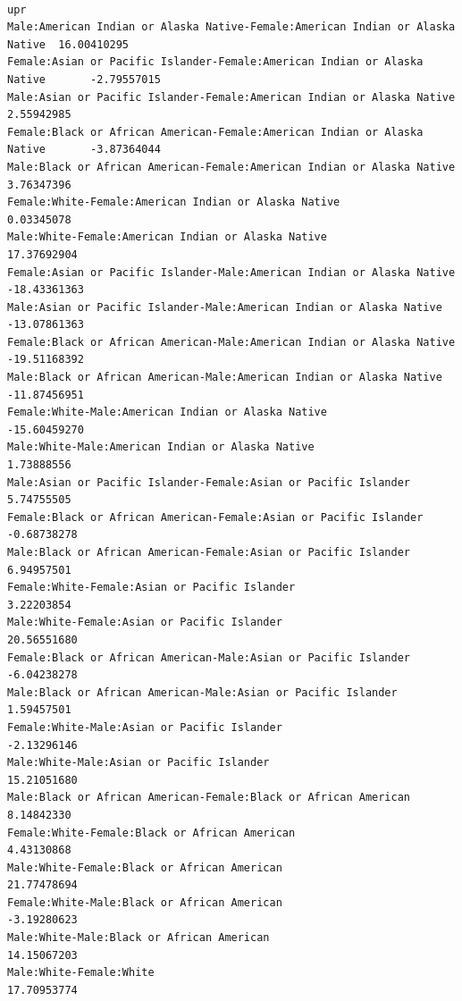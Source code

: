 \documentclass[
  letterpaper,
  DIV=11,
  numbers=noendperiod]{scrartcl}
\begin{document}
\begin{verbatim}
                                                                                       upr
Male:American Indian or Alaska Native-Female:American Indian or Alaska Native  16.00410295
Female:Asian or Pacific Islander-Female:American Indian or Alaska Native       -2.79557015
Male:Asian or Pacific Islander-Female:American Indian or Alaska Native          2.55942985
Female:Black or African American-Female:American Indian or Alaska Native       -3.87364044
Male:Black or African American-Female:American Indian or Alaska Native          3.76347396
Female:White-Female:American Indian or Alaska Native                            0.03345078
Male:White-Female:American Indian or Alaska Native                             17.37692904
Female:Asian or Pacific Islander-Male:American Indian or Alaska Native        -18.43361363
Male:Asian or Pacific Islander-Male:American Indian or Alaska Native          -13.07861363
Female:Black or African American-Male:American Indian or Alaska Native        -19.51168392
Male:Black or African American-Male:American Indian or Alaska Native          -11.87456951
Female:White-Male:American Indian or Alaska Native                            -15.60459270
Male:White-Male:American Indian or Alaska Native                                1.73888556
Male:Asian or Pacific Islander-Female:Asian or Pacific Islander                 5.74755505
Female:Black or African American-Female:Asian or Pacific Islander              -0.68738278
Male:Black or African American-Female:Asian or Pacific Islander                 6.94957501
Female:White-Female:Asian or Pacific Islander                                   3.22203854
Male:White-Female:Asian or Pacific Islander                                    20.56551680
Female:Black or African American-Male:Asian or Pacific Islander                -6.04238278
Male:Black or African American-Male:Asian or Pacific Islander                   1.59457501
Female:White-Male:Asian or Pacific Islander                                    -2.13296146
Male:White-Male:Asian or Pacific Islander                                      15.21051680
Male:Black or African American-Female:Black or African American                 8.14842330
Female:White-Female:Black or African American                                   4.43130868
Male:White-Female:Black or African American                                    21.77478694
Female:White-Male:Black or African American                                    -3.19280623
Male:White-Male:Black or African American                                      14.15067203
Male:White-Female:White                                                        17.70953774

\end{verbatim}
\end{document}

